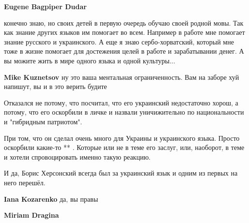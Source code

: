 \begin{itemize}
\begin{itemize}
\textbf{Eugene Bagpiper Dudar} 

конечно знаю, но своих детей в первую очередь обучаю своей родной мовы. Так как
знание других языков им помогает во всем. Например в работе мне помогает знание
русского и украинского. А еще я знаю сербо-хорватский, который мне тоже в жизне
помогает для достежения целей в работе и зарабатывании денег. А вы можите жить
в мире одного языка и одной культуры...


 
\textbf{Mike Kuznetsov} ну это ваша ментальная ограниченность. Вам на заборе хуй напишут, вы и в это верить будите

\end{itemize}

 

Отказался не потому, что посчитал, что его украинский недостаточно хорош, а
потому, что его оскорбили в личке и назвали уничижительно по национальности и
"гибридным патриотом".

При том, что он сделал очень много для Украины и украинского языка. Просто
оскорбили какие-то ** . Которые или не в теме его заслуг, или, наоборот, в теме
и хотели спровоцировать именно такую реакцию.

И да, Борис Херсонский всегда был за украинский язык и одним из первых на него
перешёл.

\begin{itemize}
 
\textbf{Iana Kozarenko} да, вы правы

 
\textbf{Miriam Dragina} 


\end{itemize}
\end{itemize}
